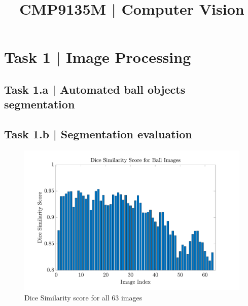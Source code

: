 \documentclass[conference]{IEEEtran}
\begin{document}
\title{CMP9135M | Computer Vision}

\author{
}

\maketitle

\begin{abstract}
\end{abstract}

\begin{IEEEkeywords}
\end{IEEEkeywords}

\section*{Task 1 | Image Processing}

\subsection*{Task 1.a | Automated ball objects segmentation}

\subsection*{Task 1.b | Segmentation evaluation}


\begin{figure}[htbp]
    \centering
    \includegraphics[width=\columnwidth]{figures/DS_bar_graph.pdf}
    \caption{Dice Similarity score for all 63 images\label{apx:best}}
\end{figure}
\end{document}
